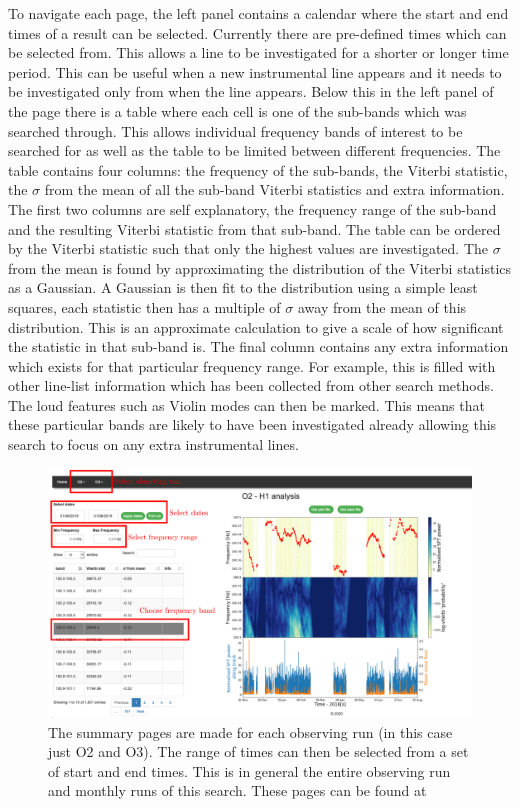 To navigate each page, the left panel contains a calendar where the
start and end times of a result can be selected.  Currently there are
pre-defined times which can be selected from. This allows a line to be
investigated for a shorter or longer time period.  This can be useful when a
new instrumental line appears and it needs to be investigated only from when
the line appears.  Below this in the left panel of the page there is a table
where each cell is one of the sub-bands which was searched through. This allows
individual frequency bands of interest to be searched for as well as the table
to be limited between different frequencies.  The table contains four columns:
the frequency of the sub-bands, the Viterbi statistic, the $\sigma$ from the
mean of all the sub-band Viterbi statistics and extra information.  The first
two columns are self explanatory, the frequency range of the sub-band and the
resulting Viterbi statistic from that sub-band. The table can be ordered by the
Viterbi statistic such that only the highest values are investigated.  The
$\sigma$ from the mean is found by approximating the distribution of the
Viterbi statistics as a Gaussian.  A Gaussian is then fit to the distribution
using a simple least squares, each statistic then has a multiple of $\sigma$
away from the mean of this distribution.  This is an approximate calculation to
give a scale of how significant the statistic in that sub-band is.  The final
column contains any extra information which exists for that particular
frequency range.  For example, this is filled with other line-list information
which has been collected from other search methods.  The loud features such as
Violin modes can then be marked. This means that these particular bands are
likely to have been investigated already allowing this search to focus on any
extra instrumental lines.
%
\begin{figure}
	\centering
	\includegraphics[width=\textwidth]{C6_detchar/summary_annot.pdf}
	\caption[Example summary page for SOAP search]{The summary pages are made for each observing run (in this case just O2 and O3). The range of times can then be selected from a set of start and end times. This is in general the entire observing run and monthly runs of this search. These pages can be found at \citep{bayleyHome}}
	\label{detchar:summary:plots}
\end{figure}
%

